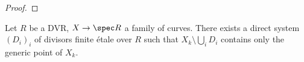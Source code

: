 \begin{lemma}
\begin{proof}





	\end{proof}
\end{lemma}

\begin{corollary}
\notready\label{cut}
	Let $R$ be a DVR, $X\to \spec R$ a family of curves. There exists a direct system $(D_{i})_{i}$ of divisors finite étale over $R$ such that $X_{k}\setminus\bigcup_{i}D_{i}$ contains only the generic point of $X_{k}$.
\end{corollary}


